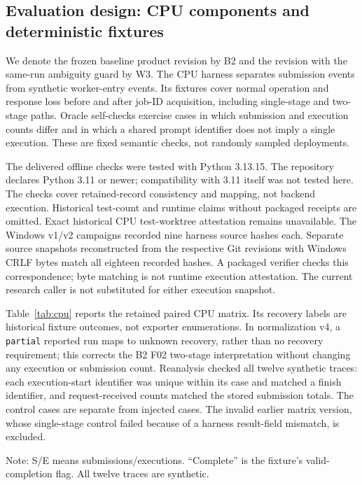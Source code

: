 \documentclass{ieeeaccess}
\begin{document}
\subsection{Evaluation design: CPU components and deterministic fixtures}

We denote the frozen baseline product revision by B2 and the revision with
the same-run ambiguity guard by W3. The CPU harness separates submission events from synthetic worker-entry events.
Its fixtures cover normal operation and response loss before and after job-ID
acquisition, including single-stage and two-stage paths. Oracle self-checks
exercise cases in which submission and execution counts differ and in which a
shared prompt identifier does not imply a single execution. These are fixed
semantic checks, not randomly sampled deployments.

The delivered offline checks were tested with Python 3.13.15. The repository
declares Python 3.11 or newer; compatibility with 3.11 itself was not tested
here. The checks cover retained-record consistency and mapping,
not backend execution. Historical test-count and runtime claims without packaged
receipts are omitted. Exact historical CPU test-worktree attestation remains
unavailable. The Windows v1/v2 campaigns recorded nine harness source hashes
each. Separate source snapshots reconstructed from the respective Git revisions
with Windows CRLF bytes match all eighteen recorded hashes. A packaged verifier
checks this correspondence; byte matching is not runtime execution attestation.
The current research caller is not substituted for either execution snapshot.

Table~\ref{tab:cpu} reports the retained paired CPU matrix. Its recovery labels
are historical fixture outcomes, not exporter enumerations. In normalization v4,
a \texttt{partial} reported run maps to unknown recovery, rather than no recovery
requirement; this corrects the B2 F02 two-stage interpretation without changing
any execution or submission count. Reanalysis checked
all twelve synthetic traces: each execution-start identifier was unique within
its case and matched a finish identifier, and request-received counts matched
the stored submission totals. The control cases are separate from injected
cases. The invalid earlier matrix version, whose single-stage control failed
because of a harness result-field mismatch, is excluded.

\begin{table}[t]
\caption{Deterministic CPU fault coverage from the retained paired-v2 matrix.}
\label{tab:cpu}
\centering

\par\smallskip
\begin{minipage}{0.8\textwidth}\footnotesize\raggedright
Note: S/E means submissions/executions. ``Complete'' is the fixture's
valid-completion flag. All twelve traces are synthetic.
\end{minipage}
\end{table}
\end{document}

